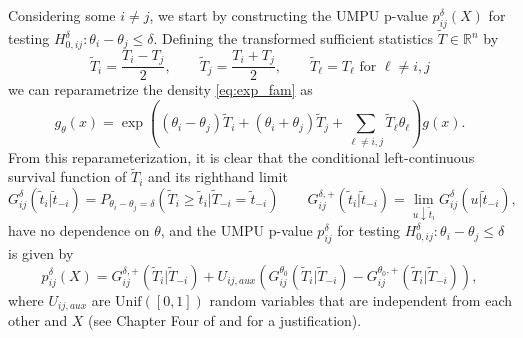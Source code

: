 \documentclass{article}
\newcommand{\R}{\mathbb{R}}
\begin{document}
Considering some $i\neq j$, we start by constructing the UMPU p-value $p^{\delta}_{ij}(X)$ for testing $H_{0, ij}^{\delta}: \theta_i - \theta_j \leq \delta$. Defining the transformed sufficient statistics $\widetilde{T} \in \R^n$ by
\begin{equation}
    \label{eq:reparam}
    \widetilde{T}_i = \frac{T_i - T_j}{2}, \qquad  \widetilde{T}_j = \frac{T_i + T_j}{2}, \qquad  \widetilde{T}_{\ell} = T_{\ell} \text{ for } \ell \neq i, j
\end{equation}
we can reparametrize the density \eqref{eq:exp_fam} as 
\begin{equation}
    \label{eq:exp_fam}
    g_{\theta}(x) = \exp\left( (\theta_i - \theta_j) \widetilde{T}_i + (\theta_i + \theta_j) \widetilde{T}_j + \sum_{\ell \neq i, j} \widetilde{T}_{\ell} \theta_{\ell} \right)g(x).
\end{equation}
From this reparameterization, it is clear that the conditional left-continuous survival function of $\widetilde{T}_i$ and its righthand limit 
\begin{equation}
    G^{\delta}_{ij}(\tilde{t}_i | \tilde{t}_{-i}) = P_{\theta_i - \theta_j = \delta}(\widetilde{T}_i \geq \tilde{t}_i | \widetilde{T}_{-i} = \tilde{t}_{-i}) \qquad G_{ij}^{\delta, +}(\tilde{t}_i | \tilde{t}_{-i}) = \lim_{u \downarrow \tilde{t}_i } G^{\delta}_{ij}(u | \tilde{t}_{-i}),
\end{equation}
have no dependence on $\theta$, and the UMPU p-value $p^{\delta}_{ij}$ for testing $H_{0, ij}^{\delta}: \theta_i - \theta_j \leq \delta$ is given by 
\begin{equation}
    \label{eq:umpu_rank_verification}
    p_{ij}^{\delta}(X) = G^{\delta, +}_{ij}(\widetilde{T}_i | \widetilde{T}_{-i}) + U_{ij, aux}(G^{\theta_0}_{ij}(\widetilde{T}_{i}|\widetilde{T}_{-i}) - G^{\theta_0, +}_{ij}(\widetilde{T}_i|\widetilde{T}_{-i})),
\end{equation}
where $U_{ij, aux}$ are $\text{Unif}([0,1])$ random variables that are independent from each other and $X$ (see Chapter Four of \cite{Lehmann} and  for a justification).
\end{document}
